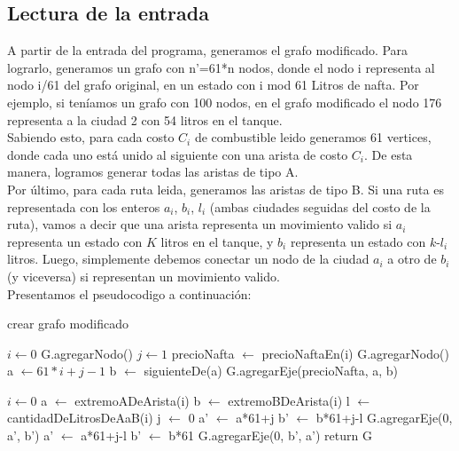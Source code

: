 \newpage

\subsection{Lectura de la entrada}

A partir de la entrada del programa, generamos el grafo modificado. Para lograrlo, generamos un grafo con n'=61*n nodos, donde el nodo i representa al nodo i/61 del grafo original, en un estado con i mod 61 Litros de nafta. Por ejemplo, si teníamos un grafo con 100 nodos, en el grafo modificado el nodo 176 representa a la ciudad 2 con 54 litros en el tanque. \\
\indent Sabiendo esto, para cada costo $C_{i}$ de combustible leido generamos 61 vertices, donde cada uno está unido al siguiente con una arista de costo $C_{i}$. De esta manera, logramos generar todas las aristas de tipo A. \\
\indent Por último, para cada ruta leida, generamos las aristas de tipo B. Si una ruta es representada con los enteros $a_{i}$, $b_{i}$, $l_{i}$ (ambas ciudades seguidas del costo de la ruta), vamos a decir que una arista representa un movimiento valido si $a_{i}$ representa un estado con $K$ litros en el tanque, y $b_{i}$ representa un estado con $k$-$l_{i}$ litros. Luego, simplemente debemos conectar un nodo de la ciudad $a_{i}$ a otro de $b_{i}$ (y viceversa) si representan un movimiento valido. \\
\indent Presentamos el pseudocodigo a continuación:

\begin{algorithm}[H]
\caption{crear grafo modificado}
\label{img2sorted}
\begin{algorithmic}[1]
\State $i \gets 0$
	\State G.agregarNodo()
	\State $j \gets 1$
	\State precioNafta $\gets$ precioNaftaEn(i)
	 
		\State G.agregarNodo()			
		\State a $\gets 61*i+j-1$			
		\State b $\gets$ siguienteDe(a)		
		\State G.agregarEje(precioNafta, a, b) 
	\EndFor
\EndFor

\State $i \gets 0$
	\State a $\gets$ extremoADeArista(i)
	\State b $\gets$ extremoBDeArista(i)
	\State l $\gets$ cantidadDeLitrosDeAaB(i)
	\State j $\gets$ 0
	 					
		 				
			\State a' $\gets$ a*61+j
			\State b' $\gets$ b*61+j-l
			\State G.agregarEje(0, a', b') 	
			\State a' $\gets$ a*61+j-l
			\State b' $\gets$ b*61
			\State G.agregarEje(0, b', a')	 
		\EndIf
	\EndFor
\EndFor
\State return G
\EndProcedure
\end{algorithmic}
\end{algorithm}

